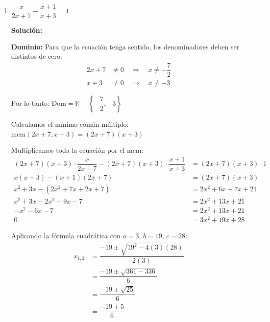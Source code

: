 \documentclass[12pt]{article}
\newcommand{\solucion}{%
    \vspace{0.8em}%
    \textbf{Solución:}%
}
\begin{document}
\begin{enumerate}[label=\alph*.-]
    \textbf{Verificación en la ecuación original:}
    \begin{itemize}
        \item Si $x = 100$: $\dfrac{100^2}{100+100} = \dfrac{10000}{200} = 50$ \checkmark
        \item Si $x = -50$: $\dfrac{(-50)^2}{-50+100} = \dfrac{2500}{50} = 50$ \checkmark
    \end{itemize}

    \[
    \boxed{CS = \{-50,\ 100\}}
    \]

    \newpage
    \item $\dfrac{x}{2x+7} - \dfrac{x+1}{x+3} = 1$

    \solucion

    \textbf{Dominio:} Para que la ecuación tenga sentido, los denominadores deben ser distintos de cero:
    \begin{align*}
    2x + 7 &\neq 0 \quad \Rightarrow \quad x \neq -\dfrac{7}{2} \\
    x + 3 &\neq 0 \quad \Rightarrow \quad x \neq -3
    \end{align*}

    Por lo tanto: $\text{Dom} = \mathbb{R} - \left\{-\dfrac{7}{2}, -3\right\}$

    Calculamos el mínimo común múltiplo: $\text{mcm}(2x+7, x+3) = (2x+7)(x+3)$

    Multiplicamos toda la ecuación por el mcm:
    \begin{align*}
    (2x+7)(x+3) \cdot \dfrac{x}{2x+7} - (2x+7)(x+3) \cdot \dfrac{x+1}{x+3} &= (2x+7)(x+3) \cdot 1 \\[0.3em]
    x(x+3) - (x+1)(2x+7) &= (2x+7)(x+3) \\[0.3em]
    x^2 + 3x - (2x^2 + 7x + 2x + 7) &= 2x^2 + 6x + 7x + 21 \\[0.3em]
    x^2 + 3x - 2x^2 - 9x - 7 &= 2x^2 + 13x + 21 \\[0.3em]
    -x^2 - 6x - 7 &= 2x^2 + 13x + 21 \\[0.3em]
    0 &= 3x^2 + 19x + 28
    \end{align*}

    Aplicando la fórmula cuadrática con $a = 3$, $b = 19$, $c = 28$:
    \begin{align*}
    x_{1,2} &= \dfrac{-19 \pm \sqrt{19^2 - 4(3)(28)}}{2(3)} \\[0.3em]
    &= \dfrac{-19 \pm \sqrt{361 - 336}}{6} \\[0.3em]
    &= \dfrac{-19 \pm \sqrt{25}}{6} \\[0.3em]
    &= \dfrac{-19 \pm 5}{6}
    \end{align*}


\end{enumerate}
\end{document}

